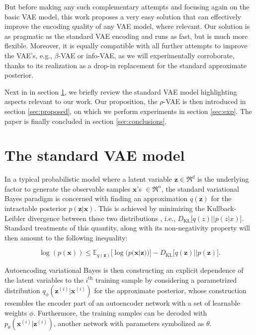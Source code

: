 \documentclass{article}
\begin{document}
But before making any such complementary attempts and focusing again on the basic VAE model, this work proposes a very easy solution that can effectively improve the encoding quality of any VAE model, where relevant. Our solution is as pragmatic as the standard VAE encoding and runs as fast, but is much more flexible. Moreover, it is equally compatible with all further attempts to improve the VAE's, e.g., $\beta$-VAE or info-VAE, as we will experimentally corroborate, thanks to its realization as a drop-in replacement for the standard approximate posterior. 

Next in in section \ref{sec:VAE}, we briefly review the standard VAE model highlighting aspects relevant to our work. Our proposition, the $\rho$-VAE is then introduced in section \ref{sec:proposed}, on which we perform experiments in section \ref{sec:exp}. The paper is finally concluded in section \ref{sec:conclusions}.

\section{The standard VAE model} \label{sec:VAE}
In a typical probabilistic model where a latent variable $\mathbf{z} \in \Re^d$ is the underlying factor to generate the observable samples $\mathbf{x}$'s $\in \Re^n$, the standard variational Bayes \cite{jordan1999introduction} paradigm is concerned with finding an approximation $q(\mathbf{z})$ for the intractable posterior $p(\mathbf{z}|\mathbf{x})$. This is achieved by minimizing the Kullback-Leibler divergence between these two distributions , i.e., $D_{\text{KL}}\big[ q(z) || p(z|x) \big]$. Standard treatments of this quantity, along with its non-negativity property will then amount to the following inequality:

\begin{equation}  \label{eq:VB_ELBO}
\log(p(\mathbf{x})) \leqslant \mathbb{E}_{q(\mathbf{z})} \Big[ \log(p(\mathbf{x}|\mathbf{z}))  \Big] - D_{\text{KL}}\Big[ q(\mathbf{z}) || p(\mathbf{z}) \Big].
\end{equation}


Autoencoding variational Bayes \cite{VAE} is then constructing an explicit dependence of the latent variables to the $i^{\text{th}}$ training sample by considering a parametrized distribution $q_{\phi}(\mathbf{z}^{(i)}|\mathbf{x}^{(i)})$ for the approximate posterior, whose construction resembles the encoder part of an autoencoder network with a set of learnable weights $\phi$. Furthermore, the training samples can be decoded with $p_{\theta}(\mathbf{x}^{(i)} | \mathbf{z}^{(i)})$, another network with parameters symbolized as $\theta$.
\end{document}
